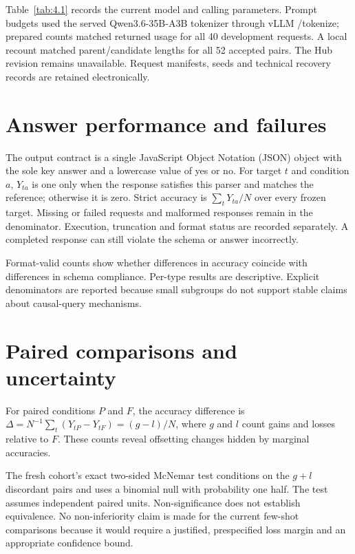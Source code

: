 \begin{table}[htbp]
\par\medskip
\begin{minipage}{\textwidth}
\noindent Table~\ref{tab:4.1} records the current model and calling parameters. Prompt budgets used the served Qwen3.6-35B-A3B tokenizer through vLLM /tokenize; prepared counts matched returned usage for all 40 development requests. A local recount matched parent/candidate lengths for all 52 accepted pairs. The Hub revision remains unavailable. Request manifests, seeds and technical recovery records are retained electronically.
\end{minipage}
\end{table}

\section{Answer performance and failures}\label{sec:4.3}

The output contract is a single JavaScript Object Notation (JSON) object with the sole key answer and a lowercase value of yes or no. For target $t$ and condition $a$, $Y_{ta}$ is one only when the response satisfies this parser and matches the reference; otherwise it is zero. Strict accuracy is $\sum_t Y_{ta}/N$ over every frozen target. Missing or failed requests and malformed responses remain in the denominator. Execution, truncation and format status are recorded separately. A completed response can still violate the schema or answer incorrectly.

Format-valid counts show whether differences in accuracy coincide with differences in schema compliance. Per-type results are descriptive. Explicit denominators are reported because small subgroups do not support stable claims about causal-query mechanisms.

\section{Paired comparisons and uncertainty}\label{sec:4.4}

For paired conditions $P$ and $F$, the accuracy difference is $\Delta=N^{-1}\sum_t(Y_{tP}-Y_{tF})=(g-l)/N$, where $g$ and $l$ count gains and losses relative to $F$. These counts reveal offsetting changes hidden by marginal accuracies.

The fresh cohort's exact two-sided McNemar test conditions on the $g+l$ discordant pairs and uses a binomial null with probability one half. The test assumes independent paired units. Non-significance does not establish equivalence. No non-inferiority claim is made for the current few-shot comparisons because it would require a justified, prespecified loss margin and an appropriate confidence bound.

